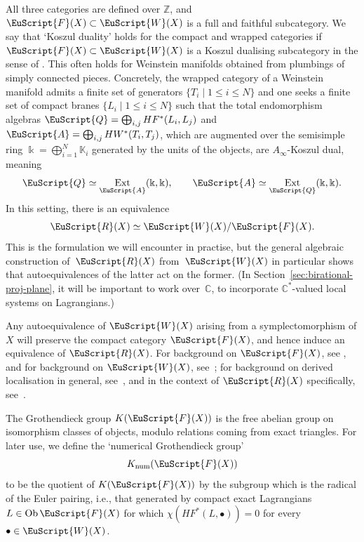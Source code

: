 \documentclass[10pt,a4paper]{amsart}
\DeclareMathOperator{\Ext}{Ext}
\def\scrA{\EuScript{A}}
\def\scrQ{\EuScript{Q}}
\def\scrR{\EuScript{R}}
\newcommand{\scrF}{\EuScript{F}}
\def\scrW{\EuScript{W}}
\def\bK{\mathbb{K}}
\def\bZ{\mathbb{Z}}
\def\bC{\mathbb{C}}
\theoremstyle{definition}
\numberwithin{equation}{section}
\begin{document}
All three categories are defined over $\bZ$, and $\scrF(X) \subset \scrW(X)$ is a full and faithful subcategory. We say that `Koszul duality' holds for the compact and wrapped categories if $\scrF(X) \subset \scrW(X)$ is a Koszul dualising subcategory in the sense of \cite[Definition~2.12]{GGV}. This often holds for Weinstein manifolds obtained from plumbings of simply connected pieces. Concretely, the wrapped category of a Weinstein manifold admits a finite set of generators $\{T_i \mid 1 \leq i \leq N\}$ and one seeks a finite set of compact branes $\{L_i \mid 1 \leq i \leq N\}$ such that the total endomorphism algebras $\scrQ = \bigoplus_{i,j} HF^*(L_i,L_j)$ and $\scrA = \bigoplus_{i,j} HW^*(T_i,T_j)$, which are augmented over the semisimple ring $\Bbbk = \bigoplus_{i=1}^N \bK_i$ generated by the units of the objects, are $A_{\infty}$-Koszul dual, meaning
\[
\scrQ \simeq \Ext_{\scrA}(\Bbbk,\Bbbk), \qquad \scrA \simeq \Ext_{\scrQ}(\Bbbk,\Bbbk).
\]
In this setting, there is an equivalence \cite[Corollary~1.4]{GGV}
\[
\scrR(X) \simeq \scrW(X) / \scrF(X).
\]
This is the formulation we will encounter in practise, but the general algebraic construction of~$\scrR(X)$ from~$\scrW(X)$ in particular shows that autoequivalences of the latter act on the former.
 (In Section~\ref{sec:birational-proj-plane}, it will be important to work over~$\bC$, to incorporate $\bC^*$-valued local systems on Lagrangians.)

 Any autoequivalence of $\scrW(X)$ arising from a symplectomorphism of $X$ will preserve the compact category $\scrF(X)$, and hence induce an equivalence of $\scrR(X)$. For background on $\scrF(X)$, see \cite{Seidel:FCPLT}, and for background on $\scrW(X)$, see~\cite{Abouzaid-Seidel:Viterbo}; for background on derived localisation in general, see~\cite{Drinfeld}, and in the context of $\scrR(X)$ specifically, see~\cite{GGV}.

The Grothendieck group $K(\scrF(X))$ is the free abelian group on isomorphism classes of objects, modulo relations coming from exact triangles.
For later use, we define the `numerical Grothendieck group'
\begin{equation}\label{eqn:Knum}
K_{\rm num}(\scrF(X))
\end{equation}
to be the quotient of $K(\scrF(X))$ by the subgroup which is the radical of the Euler pairing, i.e., that generated by compact exact Lagrangians $L \in \mathrm{Ob}\,\scrF(X)$ for which $\chi(HF^*(L,\bullet)) = 0$ for every $\bullet \in \scrW(X)$.
\end{document}
